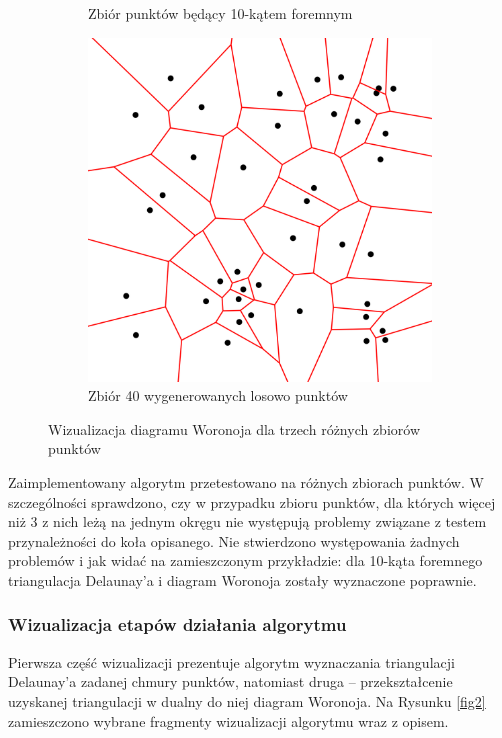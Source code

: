 \documentclass{myclass}
\begin{document}
\begin{figure}[ht]
\begin{subfigure}[b]{0.3\textwidth}
        \caption{Zbiór punktów będący 10-kątem foremnym}
    \end{subfigure}
    \hfill
    \begin{subfigure}[b]{0.3\textwidth}
        \centering
        \includegraphics[width=\textwidth]{figs/voronoi3.png}
        \caption{Zbiór 40 wygenerowanych losowo punktów}
    \end{subfigure}

    \caption{Wizualizacja diagramu Woronoja dla trzech różnych zbiorów punktów}
    \label{fig1}
\end{figure}

Zaimplementowany algorytm przetestowano na różnych zbiorach punktów. W
szczególności sprawdzono, czy w przypadku zbioru punktów, dla których więcej niż
3 z nich leżą na jednym okręgu nie występują problemy związane z testem
przynależności do koła opisanego. Nie stwierdzono występowania żadnych problemów
i jak widać na zamieszczonym przykładzie: dla 10-kąta foremnego triangulacja
Delaunay'a i diagram Woronoja zostały wyznaczone poprawnie.

\subsubsection{Wizualizacja etapów działania algorytmu}

Pierwsza część wizualizacji prezentuje algorytm wyznaczania triangulacji
Delaunay'a zadanej chmury punktów, natomiast druga -- przekształcenie uzyskanej
triangulacji w dualny do niej diagram Woronoja. Na Rysunku \ref{fig2}
zamieszczono wybrane fragmenty wizualizacji algorytmu wraz z opisem.
\end{document}
